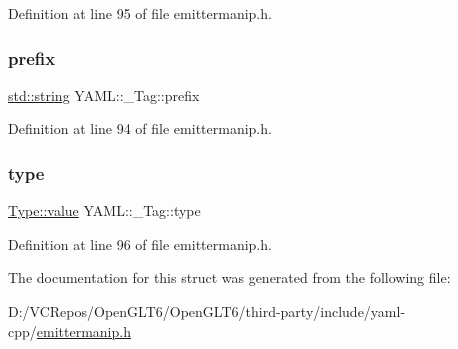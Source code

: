 Definition at line 95 of file emittermanip.\+h.

\mbox{\label{struct_y_a_m_l_1_1___tag_ac7614df0527b721a75b39945e4cc5ce6}} 
\subsubsection{\texorpdfstring{prefix}{prefix}}
{\footnotesize\ttfamily \mbox{\hyperlink{glad_8h_ac83513893df92266f79a515488701770}{std\+::string}} Y\+A\+M\+L\+::\+\_\+\+Tag\+::prefix}



Definition at line 94 of file emittermanip.\+h.

\mbox{\label{struct_y_a_m_l_1_1___tag_ae46c0817b9c559ba6ade0658bd6c7a7d}} 
\subsubsection{\texorpdfstring{type}{type}}
{\footnotesize\ttfamily \mbox{\hyperlink{struct_y_a_m_l_1_1___tag_1_1_type_a4bce10ea85e05e6d2424d3575e2bf53d}{Type\+::value}} Y\+A\+M\+L\+::\+\_\+\+Tag\+::type}



Definition at line 96 of file emittermanip.\+h.



The documentation for this struct was generated from the following file\+:\begin{DoxyCompactItemize}
\item 
D\+:/\+V\+C\+Repos/\+Open\+G\+L\+T6/\+Open\+G\+L\+T6/third-\/party/include/yaml-\/cpp/\mbox{\hyperlink{emittermanip_8h}{emittermanip.\+h}}\end{DoxyCompactItemize}
